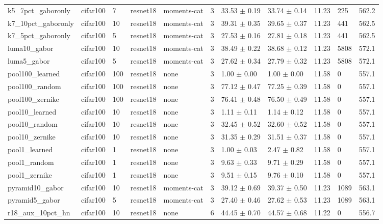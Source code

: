 \begin{tabular}{lllllllllll}
k5_7pct_gaboronly & cifar100 & 7 & resnet18 & moments-cat & 3 & 33.53 $\pm$ 0.19 & 33.74 $\pm$ 0.14 & 11.23 & 225 & 562.2 \\
k7_10pct_gaboronly & cifar100 & 10 & resnet18 & moments-cat & 3 & 39.31 $\pm$ 0.35 & 39.65 $\pm$ 0.37 & 11.23 & 441 & 562.5 \\
k7_5pct_gaboronly & cifar100 & 5 & resnet18 & moments-cat & 3 & 27.53 $\pm$ 0.16 & 27.81 $\pm$ 0.18 & 11.23 & 441 & 562.5 \\
luma10_gabor & cifar100 & 10 & resnet18 & moments-cat & 3 & 38.49 $\pm$ 0.22 & 38.68 $\pm$ 0.12 & 11.23 & 5808 & 572.1 \\
luma5_gabor & cifar100 & 5 & resnet18 & moments-cat & 3 & 27.62 $\pm$ 0.34 & 27.79 $\pm$ 0.32 & 11.23 & 5808 & 572.1 \\
pool100_learned & cifar100 & 100 & resnet18 & none & 3 & 1.00 $\pm$ 0.00 & 1.00 $\pm$ 0.00 & 11.58 & 0 & 557.1 \\
pool100_random & cifar100 & 100 & resnet18 & none & 3 & 77.12 $\pm$ 0.47 & 77.25 $\pm$ 0.39 & 11.58 & 0 & 557.1 \\
pool100_zernike & cifar100 & 100 & resnet18 & none & 3 & 76.41 $\pm$ 0.48 & 76.50 $\pm$ 0.49 & 11.58 & 0 & 557.1 \\
pool10_learned & cifar100 & 10 & resnet18 & none & 3 & 1.11 $\pm$ 0.11 & 1.14 $\pm$ 0.12 & 11.58 & 0 & 557.1 \\
pool10_random & cifar100 & 10 & resnet18 & none & 3 & 32.45 $\pm$ 0.52 & 32.60 $\pm$ 0.52 & 11.58 & 0 & 557.1 \\
pool10_zernike & cifar100 & 10 & resnet18 & none & 3 & 31.35 $\pm$ 0.29 & 31.51 $\pm$ 0.37 & 11.58 & 0 & 557.1 \\
pool1_learned & cifar100 & 1 & resnet18 & none & 3 & 1.00 $\pm$ 0.03 & 2.47 $\pm$ 0.82 & 11.58 & 0 & 557.1 \\
pool1_random & cifar100 & 1 & resnet18 & none & 3 & 9.63 $\pm$ 0.33 & 9.71 $\pm$ 0.29 & 11.58 & 0 & 557.1 \\
pool1_zernike & cifar100 & 1 & resnet18 & none & 3 & 9.51 $\pm$ 0.15 & 9.76 $\pm$ 0.10 & 11.58 & 0 & 557.1 \\
pyramid10_gabor & cifar100 & 10 & resnet18 & moments-cat & 3 & 39.12 $\pm$ 0.69 & 39.37 $\pm$ 0.50 & 11.23 & 1089 & 563.1 \\
pyramid5_gabor & cifar100 & 5 & resnet18 & moments-cat & 3 & 27.40 $\pm$ 0.46 & 27.62 $\pm$ 0.53 & 11.23 & 1089 & 563.1 \\
r18_aux_10pct_hn & cifar100 & 10 & resnet18 & none & 6 & 44.45 $\pm$ 0.70 & 44.57 $\pm$ 0.68 & 11.22 & 0 & 556.7 \\

\end{tabular}
